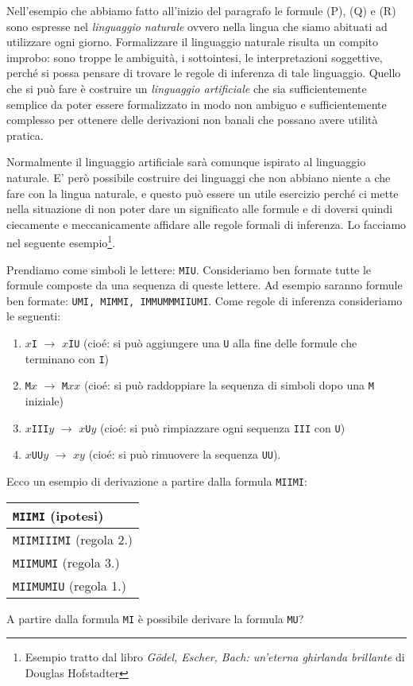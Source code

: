 \documentclass[italian,a4paper,hidelinks,headinclude]{scrartcl}
\newcommand{\myemph}[1]{\emph{#1}\marginpar{#1}}
\begin{document}
Nell'esempio che abbiamo fatto all'inizio del paragrafo le formule (P), (Q) e (R)
sono espresse nel \myemph{linguaggio naturale} ovvero nella lingua che
siamo abituati ad utilizzare ogni giorno. Formalizzare il linguaggio
naturale risulta un compito improbo: sono troppe le ambiguità, i
sottointesi, le interpretazioni soggettive, perché si possa pensare di
trovare le regole di inferenza di tale linguaggio. Quello che si può fare è
costruire un \myemph{linguaggio artificiale} che sia  sufficientemente
semplice da poter essere formalizzato in modo non ambiguo
e sufficientemente complesso per ottenere delle derivazioni non banali che possano avere utilità pratica.

 Normalmente
il linguaggio artificiale sarà comunque ispirato al linguaggio
naturale. E' però possibile costruire dei linguaggi che non abbiano
niente a che fare con la lingua naturale, e questo può essere un utile
esercizio perché ci mette nella situazione di non poter dare un significato
alle formule e di doversi quindi ciecamente e meccanicamente affidare
alle regole formali di inferenza. Lo facciamo nel seguente
esempio\footnote{%
  Esempio tratto dal libro
    \emph{G\"odel, Escher, Bach: un'eterna ghirlanda brillante} di
    Douglas Hofstadter}.

\begin{example}
Prendiamo come simboli le lettere: \texttt{MIU}.
Consideriamo ben formate tutte
le formule composte da una sequenza di queste lettere. Ad esempio
saranno formule ben formate: \texttt{UMI, MIMMI, IMMUMMMIIUMI}. Come
regole di inferenza consideriamo le seguenti:
\begin{enumerate}
\item  $x$\texttt{I} $\to$ $x$\texttt{IU} (cioé: si può aggiungere una
  \texttt{U} alla fine delle formule che terminano con \texttt{I})
\item \texttt{M}$x$ $\to$ \texttt{M}$xx$ (cioé: si può raddoppiare la
  sequenza di simboli dopo una \texttt{M} iniziale)
\item $x$\texttt{III}$y$ $\to$ $x$\texttt{U}$y$ (cioé: si può
  rimpiazzare ogni sequenza \texttt{III} con \texttt{U})
\item $x$\texttt{UU}$y$ $\to$ $xy$ (cioé: si può rimuovere la sequenza \texttt{UU}).
\end{enumerate}
Ecco un esempio di derivazione a partire dalla formula \texttt{MIIMI}:
\begin{center}
  \begin{tabular}{l}
    \texttt{MIIMI} (ipotesi)\\\hline
    \texttt{MIIMIIIMI} (regola 2.)\\
    \texttt{MIIMUMI} (regola 3.)\\
    \texttt{MIIMUMIU} (regola 1.)\\
  \end{tabular}
\end{center}

A partire dalla formula \texttt{MI} è possibile derivare la formula \texttt{MU}?
\end{example}
\end{document}
